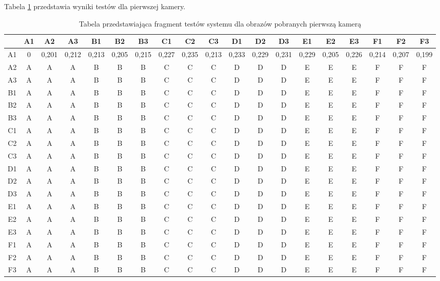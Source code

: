 Tabela \ref{tab:pierwsza} przedstawia wyniki testów dla pierwszej kamery.
\begin{table}
\caption{Tabela przedstawiająca fragment testów systemu dla obrazów pobranych pierwszą kamerą}
\label{tab:pierwsza}
\begin{tabular}{|c|c|c|c|c|c|c|c|c|c|c|c|c|c|c|c|c|c|c|}
\hline
 & A1 & A2 & A3 & B1 & B2 & B3 & C1 & C2 & C3 & D1 & D2 & D3 & E1 & E2 & E3 & F1 & F2 & F3\\ \hline
A1 & 0&0,201&0,212&0,213&0,205&0,215&0,227&0,235&0,213&0,233&0,229&0,231&0,229&0,205&0,226&0,214&0,207&0,199 \\ \hline
A2 & A & A & A & B & B & B & C & C & C & D & D & D & E & E & E & F & F & F\\ \hline
A3 & A & A & A & B & B & B & C & C & C & D & D & D & E & E & E & F & F & F\\ \hline
B1 & A & A & A & B & B & B & C & C & C & D & D & D & E & E & E & F & F & F\\ \hline
B2 & A & A & A & B & B & B & C & C & C & D & D & D & E & E & E & F & F & F\\ \hline
B3 & A & A & A & B & B & B & C & C & C & D & D & D & E & E & E & F & F & F\\ \hline
C1 & A & A & A & B & B & B & C & C & C & D & D & D & E & E & E & F & F & F\\ \hline
C2 & A & A & A & B & B & B & C & C & C & D & D & D & E & E & E & F & F & F\\ \hline
C3 & A & A & A & B & B & B & C & C & C & D & D & D & E & E & E & F & F & F\\ \hline
D1 & A & A & A & B & B & B & C & C & C & D & D & D & E & E & E & F & F & F\\ \hline
D2 & A & A & A & B & B & B & C & C & C & D & D & D & E & E & E & F & F & F\\ \hline
D3 & A & A & A & B & B & B & C & C & C & D & D & D & E & E & E & F & F & F\\ \hline
E1 & A & A & A & B & B & B & C & C & C & D & D & D & E & E & E & F & F & F\\ \hline
E2 & A & A & A & B & B & B & C & C & C & D & D & D & E & E & E & F & F & F\\ \hline
E3 & A & A & A & B & B & B & C & C & C & D & D & D & E & E & E & F & F & F\\ \hline
F1 & A & A & A & B & B & B & C & C & C & D & D & D & E & E & E & F & F & F\\ \hline
F2 & A & A & A & B & B & B & C & C & C & D & D & D & E & E & E & F & F & F\\ \hline
F3 & A & A & A & B & B & B & C & C & C & D & D & D & E & E & E & F & F & F\\ \hline

\end{tabular}
\end{table}

